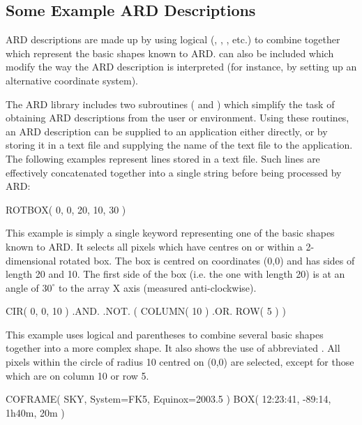 \documentclass[11pt]{starlink}
\begin{document}
\subsection{Some Example ARD Descriptions}
ARD descriptions are made up by using logical 
(, , ,
etc.) to combine together  which represent the basic shapes known to ARD.
 can also be included which modify the way the ARD description is
interpreted (for instance, by setting up an alternative coordinate system).

The ARD library includes two subroutines ( and
) which
simplify the task of obtaining ARD descriptions from the user or environment.
Using these routines, an ARD description can be supplied to an application
either directly, or by storing it in a text file and supplying the name of the
text file to the application. The following examples represent lines stored in a
text file. Such lines are effectively concatenated together into a single string
before being processed by ARD:

\small
\begin{terminalv}
      ROTBOX( 0, 0, 20, 10, 30 )
\end{terminalv}
\normalsize

This example is simply a single keyword representing one of the basic shapes
known to ARD. It selects all pixels which have centres on or within a
2-dimensional rotated box. The box is centred on coordinates (0,0) and has
sides of length 20 and 10. The first side of the box (i.e. the one with length
20) is at an angle of $30^{\circ}$ \hspace{1mm} to the array X axis (measured
anti-clockwise).

\small
\begin{terminalv}
      CIR( 0, 0, 10 ) .AND. .NOT. ( COLUMN( 10 ) .OR. ROW( 5 ) )
\end{terminalv}
\normalsize

This example uses logical  and parentheses to combine several basic
shapes together into a more complex shape. It also shows the use of abbreviated
. All pixels within the circle of radius 10 centred on (0,0) are
selected, except for those which are on column 10 or row 5.

\small
\begin{terminalv}
      COFRAME( SKY, System=FK5, Equinox=2003.5 )
      BOX( 12:23:41, -89:14, 1h40m, 20m )
\end{terminalv}
\normalsize
\end{document}
